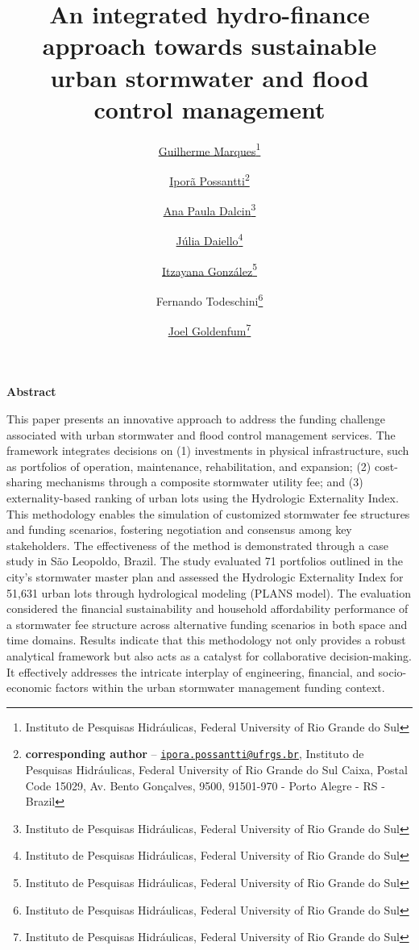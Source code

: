 \documentclass[11pt]{article}
\title{\Large{\textsf{\textbf{An integrated hydro-finance approach towards sustainable urban stormwater and flood control management}}}}
\author{
\href{https://orcid.org/0000-0003-0543-6279}{Guilherme Marques}\thanks{Instituto de Pesquisas Hidráulicas, Federal University of Rio Grande do Sul} \and \href{https://orcid.org/0000-0002-2194-4516}{Iporã Possantti}\thanks{\textbf{corresponding author} -- \href{mailto:ipora.possantti@ufrgs.br}{\texttt{ipora.possantti@ufrgs.br}}, Instituto de Pesquisas Hidráulicas, Federal University of Rio Grande do Sul Caixa, Postal Code 15029, Av. Bento Gonçalves, 9500, 91501-970 - Porto Alegre - RS - Brazil}\and \href{https://orcid.org/0000-0001-9871-7373}{Ana Paula Dalcin}\thanks{Instituto de Pesquisas Hidráulicas, Federal University of Rio Grande do Sul} \and \href{https://orcid.org/0009-0007-2388-5162}{Júlia Daiello}\thanks{Instituto de Pesquisas Hidráulicas, Federal University of Rio Grande do Sul} \and \href{https://orcid.org/0000-0003-1684-8885}{Itzayana González}\thanks{Instituto de Pesquisas Hidráulicas, Federal University of Rio Grande do Sul} \and Fernando Todeschini\thanks{Instituto de Pesquisas Hidráulicas, Federal University of Rio Grande do Sul} \and \href{https://orcid.org/0000-0003-4959-9053}{Joel Goldenfum}\thanks{Instituto de Pesquisas Hidráulicas, Federal University of Rio Grande do Sul}}
\begin{document}
\maketitle  %
	
\begin{adjustwidth}{20pt}{20pt}
\begin{spacing}{0.8}
	\small
	\begin{center}
		\vspace{10mm}
		\textsf{\textbf{Abstract}}
		\vspace{5mm}
	\end{center}
	
	\noindent This paper presents an innovative approach to address the funding challenge associated with urban stormwater and flood control management services. The framework integrates decisions on (1) investments in physical infrastructure, such as portfolios of operation, maintenance, rehabilitation, and expansion; (2) cost-sharing mechanisms through a composite stormwater utility fee; and (3) externality-based ranking of urban lots using the Hydrologic Externality Index. This methodology enables the simulation of customized stormwater fee structures and funding scenarios, fostering negotiation and consensus among key stakeholders. The effectiveness of the method is demonstrated through a case study in São Leopoldo, Brazil. The study evaluated 71 portfolios outlined in the city's stormwater master plan and assessed the Hydrologic Externality Index for 51,631 urban lots through hydrological modeling (PLANS model). The evaluation considered the financial sustainability and household affordability performance of a stormwater fee structure across alternative funding scenarios in both space and time domains. Results indicate that this methodology not only provides a robust analytical framework but also acts as a catalyst for collaborative decision-making. It effectively addresses the intricate interplay of engineering, financial, and socio-economic factors within the urban stormwater management funding context. \\[2ex]
	

\end{spacing}
\end{adjustwidth}
\end{document}
